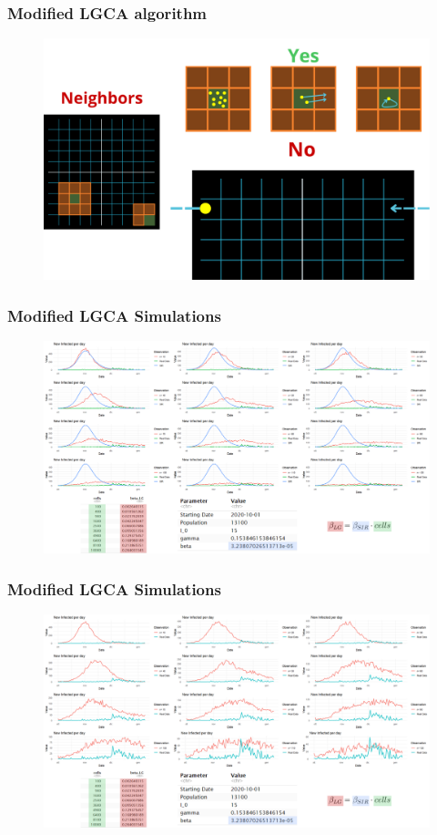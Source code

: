 \documentclass[usenames,dvipsnames]{beamer}
\begin{document}
\begin{frame}
	\frametitle{Modified LGCA algorithm}

		\begin{figure}
		\centering
		\includegraphics[width=0.9\linewidth]{modified_pres}
	\end{figure}
\end{frame}


\begin{frame}
	\frametitle{Modified LGCA Simulations}

		\begin{figure}
	\centering
	\includegraphics[width=0.95\linewidth]{MLGCA_withSIR}
\end{figure}
\end{frame}

\begin{frame}
	\frametitle{Modified LGCA Simulations}
	
	\begin{figure}
		\centering
		\includegraphics[width=0.95\linewidth]{MGCA_NOSIR}
	\end{figure}

\end{frame}
\end{document}
